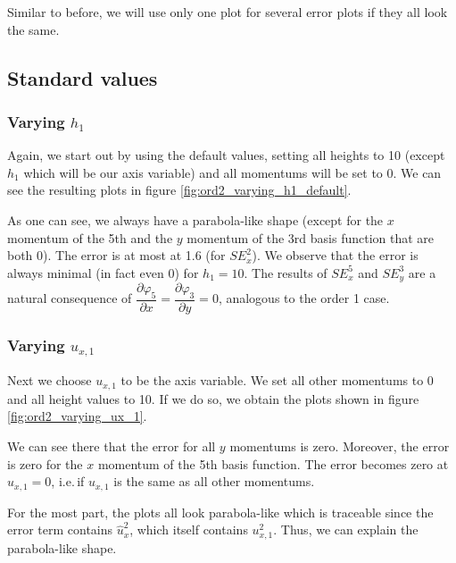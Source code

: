 \documentclass{article}
\newcommand{\pd}[2]{\dfrac{\partial #1}{\partial #2}}
\renewcommand{\phi}{\varphi}
\begin{document}
Similar to before, we will use only one plot for several error plots if they all look the same.

\subsection{Standard values}
\label{sec:stiffness-analyiss-ord2-default}

\subsubsection{\texorpdfstring{Varying $h_1$}{Varying h1}}
\label{sec:stiffness-analysis-ord2-default-var-h1}

Again, we start out by using the default values, setting all heights to 10 (except $h_1$ which will be our axis variable) and all momentums will be set to 0. We can see the resulting plots in figure \ref{fig:ord2_varying_h1_default}.



As one can see, we always have a parabola-like shape (except for the $x$ momentum of the 5th and the $y$ momentum of the 3rd basis function that are both 0). The error is at most at 1.6 (for $SE_x^2$). We observe that the error is always minimal (in fact even 0) for $h_1=10$. The results of $SE_x^5$ and $SE_y^3$ are a natural consequence of $\pd{\phi_5}{x}=\pd{\phi_3}{y}=0$, analogous to the order 1 case.

\subsubsection{\texorpdfstring{Varying $u_{x,1}$}{Varying ux1}}
\label{sec:stiffness-analysis-ord2-default-var-ux1}

Next we choose $u_{x,1}$ to be the axis variable. We set all other momentums to 0 and all height values to 10. If we do so, we obtain the plots shown in figure \ref{fig:ord2_varying_ux_1}.



We can see there that the error for all $y$ momentums is zero. Moreover, the error is zero for the $x$ momentum of the 5th basis function. The error becomes zero at $u_{x,1}=0$, i.e.\,if $u_{x,1}$ is the same as all other momentums.

For the most part, the plots all look parabola-like which is traceable since the error term contains $\widehat{u}_x^2$, which itself contains $u_{x,1}^2$. Thus, we can explain the parabola-like shape.
\end{document}

